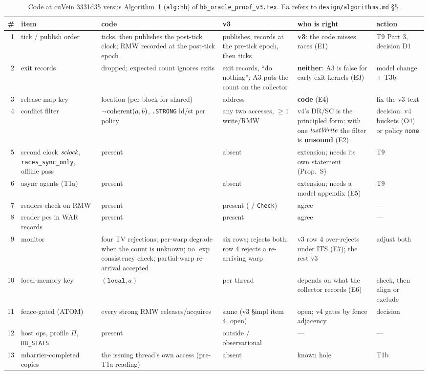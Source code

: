 \begin{table}[htbp]  %
\footnotesize
\centering
\caption{Code at cuVein 3331d35 versus Algorithm~1 (\texttt{alg:hb}) of \texttt{hb\_oracle\_proof\_v3.tex}. E$n$ refers to \texttt{design/algorithms.md} \S5.}\label{tab:deviations}
\begin{tabular}{@{}r@{\ \ }p{2.3cm}p{3.1cm}p{2.9cm}p{3.1cm}p{2.3cm}@{}}
\toprule
\# & item & code & v3 & who is right & action \\
\midrule
1 & tick / publish order & ticks, then publishes the post-tick clock; RMW recorded at the post-tick epoch & publishes, records at the pre-tick epoch, then ticks & \textbf{v3}: the code misses races (E1) & T9 Part 3, decision D1 \\
2 & exit records & dropped; expected count ignores exits & exit records, ``do nothing''; A3 puts the count on the collector & \textbf{neither}: A3 is false for early-exit kernels (E3) & model change + T3b \\
3 & release-map key & location (per block for shared) & address & \textbf{code} (E4) & fix the v3 text \\
4 & conflict filter & $\neg\operatorname{coherent}(a,b)$, \texttt{.STRONG} ld/st per policy & any two accesses, $\ge1$ write/RMW & v4's DR/SC is the principled form; with one $\mathit{lastWrite}$ the filter is \textbf{unsound} (E2) & decision: v4 buckets (O4) or policy \texttt{none} \\
5 & second clock $\mathit{sclock}$, \texttt{races\_sync\_only}, offline pass & present & absent & extension; needs its own statement (Prop.~S) & T9 \\
6 & async agents (T1a) & present & absent & extension; needs a model appendix (E5) & T9 \\
7 & readers check on RMW & present & present (\Conflict{} / \texttt{Check}) & agree & --- \\
8 & reader pcs in WAR records & present & present & agree & --- \\
9 & monitor & four TV rejections; per-warp degrade when the count is unknown; no $\exp$ consistency check; partial-warp re-arrival accepted & six rows; rejects both; row 4 rejects a re-arriving warp & v3 row 4 over-rejects under ITS (E7); the rest v3 & adjust both \\
10 & local-memory key & $(\texttt{local},a)$ & per thread & depends on what the collector records (E6) & check, then align or exclude \\
11 & fence-gated (ATOM) & every strong RMW releases/acquires & same (v3 \S impl item 4, open) & open; v4 gates by fence adjacency & decision \\
12 & host ops, profile $\Pi$, \texttt{HB\_STATS} & present & outside / observational & --- & --- \\
13 & mbarrier-completed copies & the issuing thread's own access (pre-T1a reading) & absent & known hole & T1b \\
\bottomrule
\end{tabular}
\end{table}
